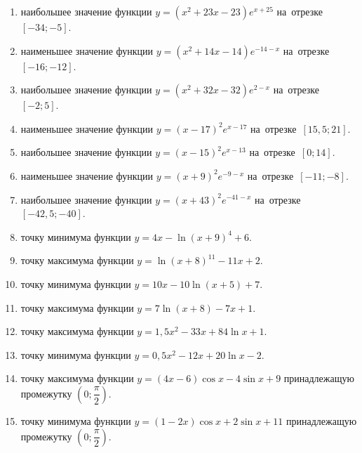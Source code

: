 \documentclass[a4paper,10pt]{article}
\begin{document}
\begin{enumerate}
\item {} наибольшее значение функции $y=\left(x^2 +23x -23\right)e^{x+25}$ на~отрезке~$\left[-34;-5\right]$.

\item {} наименьшее значение функции $y=\left(x^2 +14x -14\right)e^{-14-x}$ на~отрезке~$\left[-16;-12\right]$.

\item {} наибольшее значение функции $y=\left(x^2 +32x -32\right)e^{2-x}$ на~отрезке~$\left[-2;5\right]$.

\item {} наименьшее значение функции $y=\left(x-17\right)^2e^{x-17}$ на~отрезке~$\left[15,5;21\right]$.

\item {} наибольшее значение функции $y=\left(x-15\right)^2e^{x-13}$ на~отрезке~$\left[0;14\right]$.

\item {} наименьшее значение функции $y=\left(x+9\right)^2e^{-9-x}$ на~отрезке~$\left[-11;-8\right]$.

\item {} наибольшее значение функции $y=\left(x+43\right)^2e^{-41-x}$ на~отрезке~$\left[-42,5;-40\right]$.

\item {} точку минимума функции $y=4x-\ln\left(x+9\right)^{4}+6$.

\item {} точку максимума функции $y=\ln\left(x+8\right)^{11}-11x+2$.

\item {} точку минимума функции $y=10x-10\ln\left(x+5\right)+7$.

\item {} точку максимума функции $y=7\ln\left(x+8\right)-7x+1$.

\item {} точку максимума функции $y=1,5x^2-33x+84\ln x +1$.

\item {} точку минимума функции $y=0,5x^2-12x+20\ln x -2$.

\item {} точку максимума функции $y=\left(4x-6\right)\cos x -4\sin x+9$
принадлежащую промежутку $\left(0;\dfrac{\pi}{2}\right)$.

\item {} точку минимума функции $y=\left(1-2x\right)\cos x +2\sin x+11$
принадлежащую промежутку $\left(0;\dfrac{\pi}{2}\right)$.


\end{enumerate}
\end{document}
